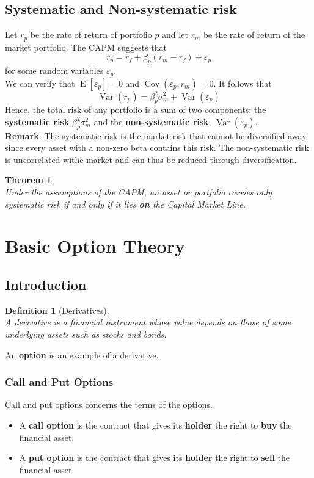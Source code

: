 \documentclass[12pt]{article}
\newtheorem{definition}{Definition}[section]
\newtheorem{theorem}{Theorem}[section]
\theoremstyle{definition}
\DeclareMathOperator{\expec}{E}
\DeclareMathOperator{\var}{Var}
\DeclareMathOperator{\cov}{Cov}
\begin{document}
\subsection{Systematic and Non-systematic risk}
Let $r_p$ be the rate of return of portfolio $p$ and let $r_m$ be the rate of return of the market portfolio. The CAPM suggests that
\[
r_p = r_f +\beta_p(r_m-r_f)+\varepsilon_p
\]
for some random variables $\varepsilon_p$.\\
We can verify that $\expec[\varepsilon_p]=0$ and $\cov(\varepsilon_p,r_m)=0$. It follows that
\[
\var(r_p)=\beta_p^2\sigma_m^2+\var(\varepsilon_p)
\]
Hence, the total risk of any portfolio is a sum of two components: the \textbf{systematic risk} $\beta_p^2\sigma_m^2$ and the \textbf{non-systematic risk}, $\var(\varepsilon_p)$.\\
\textbf{Remark}: The systematic risk is the market risk that cannot be diversified away since every asset with a non-zero beta contains this risk. The non-systematic risk is uncorrelated withe market and can thus be reduced through diversification.
\begin{theorem}\hfill\\\normalfont
Under the assumptions of the CAPM, an asset or portfolio carries only systematic risk \textit{if and only if} it lies \textbf{on} the Capital Market Line.
\end{theorem}
\clearpage
\section{Basic Option Theory}
\subsection{Introduction}
\begin{definition}[Derivatives]
\hfill\\\normalfont A derivative is a financial instrument whose value depends on those of some underlying assets such as stocks and bonds. 
\end{definition}
An \textbf{option} is an example of a derivative.
\subsubsection{Call and Put Options}
Call and put options concerns the terms of the options.
\begin{itemize}
  \item A \textbf{call option} is the contract that gives its \textbf{holder} the right to \textbf{buy} the financial asset.
  \item A \textbf{put option} is the contract that gives its \textbf{holder} the right to \textbf{sell} the financial asset.
\end{itemize}
\end{document}
